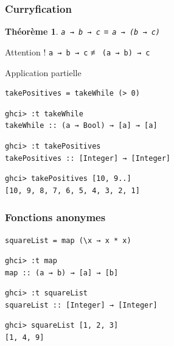 \documentclass[10pt]{beamer}
\newtheorem{thrm}{Théorème}
\begin{document}
\begin{frame}[fragile]
\frametitle{Curryfication}
\begin{thrm}
\verb|a → b → c| ≡ \verb|a → (b → c)|
\end{thrm}

\pause

\begin{block}
{Attention !}
\verb|a → b → c| ≢ \verb|(a → b) → c|
\end{block}

\pause

\begin{block}
{Application partielle}
\begin{verbatim}
takePositives = takeWhile (> 0)
\end{verbatim}
\pause
\begin{verbatim}
ghci> :t takeWhile
takeWhile :: (a → Bool) → [a] → [a]
\end{verbatim}
\pause
\begin{verbatim}
ghci> :t takePositives
takePositives :: [Integer] → [Integer]
\end{verbatim}
\pause
\begin{verbatim}
ghci> takePositives [10, 9..]
[10, 9, 8, 7, 6, 5, 4, 3, 2, 1]
\end{verbatim}
\end{block}
\end{frame}



\begin{frame}[fragile]
\frametitle{Fonctions anonymes}
\begin{verbatim}
squareList = map (\x → x * x)
\end{verbatim}
\pause

\begin{verbatim}
ghci> :t map
map :: (a → b) → [a] → [b]
\end{verbatim}
\pause

\begin{verbatim}
ghci> :t squareList
squareList :: [Integer] → [Integer]
\end{verbatim}
\pause

\begin{verbatim}
ghci> squareList [1, 2, 3]
[1, 4, 9]
\end{verbatim}
\end{frame}
\end{document}
